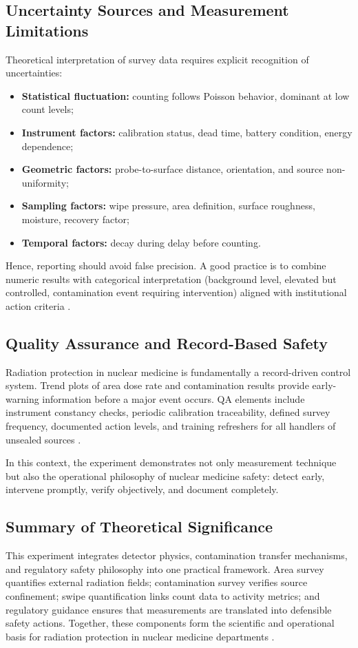 \subsection{Uncertainty Sources and Measurement Limitations}
Theoretical interpretation of survey data requires explicit recognition of uncertainties:
\begin{itemize}
    \item \textbf{Statistical fluctuation:} counting follows Poisson behavior, dominant at low count levels;
    \item \textbf{Instrument factors:} calibration status, dead time, battery condition, energy dependence;
    \item \textbf{Geometric factors:} probe-to-surface distance, orientation, and source non-uniformity;
    \item \textbf{Sampling factors:} wipe pressure, area definition, surface roughness, moisture, recovery factor;
    \item \textbf{Temporal factors:} decay during delay before counting.
\end{itemize}

Hence, reporting should avoid false precision. A good practice is to combine numeric results with categorical interpretation (background level, elevated but controlled, contamination event requiring intervention) aligned with institutional action criteria \cite{knoll2010radiation,iaea_ssg46}.

\subsection{Quality Assurance and Record-Based Safety}
Radiation protection in nuclear medicine is fundamentally a record-driven control system. Trend plots of area dose rate and contamination results provide early-warning information before a major event occurs. QA elements include instrument constancy checks, periodic calibration traceability, defined survey frequency, documented action levels, and training refreshers for all handlers of unsealed sources \cite{aerb_publications,iaea_gsr3,iaea_ssg46}.

In this context, the experiment demonstrates not only measurement technique but also the operational philosophy of nuclear medicine safety: detect early, intervene promptly, verify objectively, and document completely.

\subsection{Summary of Theoretical Significance}
This experiment integrates detector physics, contamination transfer mechanisms, and regulatory safety philosophy into one practical framework. Area survey quantifies external radiation fields; contamination survey verifies source confinement; swipe quantification links count data to activity metrics; and regulatory guidance ensures that measurements are translated into defensible safety actions. Together, these components form the scientific and operational basis for radiation protection in nuclear medicine departments \cite{icrp103,iaea_gsr3,iaea_ssg46,aerb_rpr2004,aerb_rfsc_2025}.
